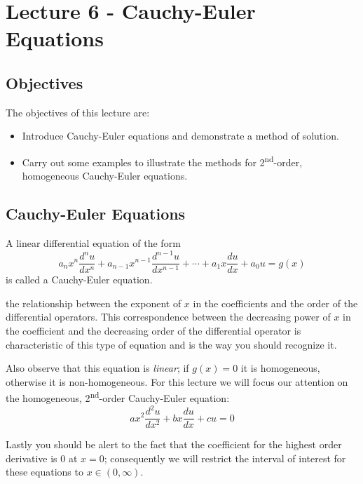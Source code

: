 \chapter{Lecture 6 - Cauchy-Euler Equations}
\label{ch:lec6}
\section{Objectives}
The objectives of this lecture are:
\begin{itemize}
\item Introduce Cauchy-Euler equations and demonstrate a method of solution.
\item Carry out some examples to illustrate the methods for 2\textsuperscript{nd}-order, homogeneous Cauchy-Euler equations.
\end{itemize}

\section{Cauchy-Euler Equations}

A linear differential equation of the form
\begin{equation}
a_nx^n\frac{d^n u}{dx^n}+a_{n-1}x^{n-1}\frac{d^{n-1}u}{dx^{n-1}}+\cdots+a_1x\frac{du}{dx}+a_0u=g(x)
\label{eq:cauchy-euler-eqn}
\end{equation}
is called a Cauchy-Euler equation.

 the relationship between the exponent of $x$ in the coefficients and the order of the differential operators.  This correspondence between the decreasing power of $x$ in the coefficient and the decreasing order of the differential operator is characteristic of this type of equation and is the way you should recognize it. 

Also observe that this equation is \emph{linear}; if $g(x)=0$ it is homogeneous, otherwise it is non-homogeneous.  For this lecture we will focus our attention on the homogeneous, 2\textsuperscript{nd}-order Cauchy-Euler equation:
\begin{equation}
ax^2\frac{d^2u}{dx^2}+bx\frac{du}{dx}+cu=0
\end{equation}

Lastly you should be alert to the fact that the coefficient for the highest order derivative is 0 at $x=0$; consequently we will restrict the interval of interest for these equations to $x \in \left(0,\infty\right)$.

